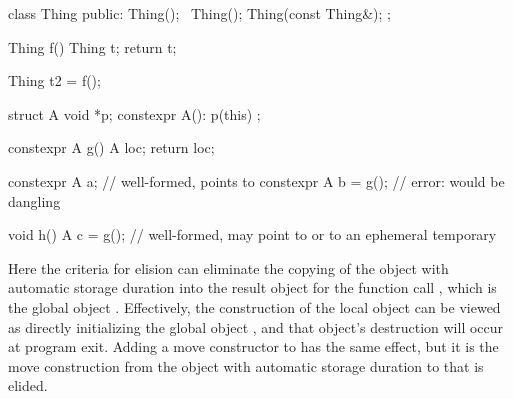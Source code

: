 \pnum
\begin{example}
\begin{codeblock}
class Thing {
public:
  Thing();
  ~Thing();
  Thing(const Thing&);
};

Thing f() {
  Thing t;
  return t;
}

Thing t2 = f();

struct A {
  void *p;
  constexpr A(): p(this) {}
};

constexpr A g() {
  A loc;
  return loc;
}

constexpr A a;          // well-formed,  points to 
constexpr A b = g();    // error:  would be dangling

void h() {
  A c = g();            // well-formed,  may point to  or to an ephemeral temporary
}
\end{codeblock}
Here the criteria for elision can eliminate
the copying of the object  with automatic storage duration
into the result object for the function call ,
which is the global object .
Effectively, the construction of the local object 
can be viewed as directly initializing the global object ,
and that object's destruction will occur at program exit.
Adding a move constructor to  has the same effect, but it is the
move construction from the object with automatic storage duration to  that is elided.
\end{example}

